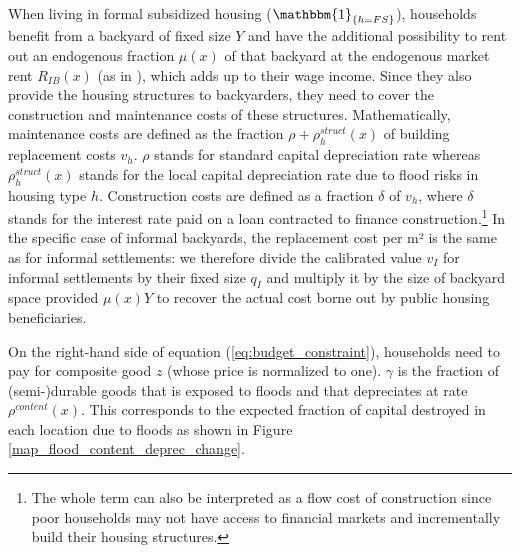 \documentclass[12pt]{article}
\begin{document}
When living in formal subsidized housing ($\mathbbm{1}_{\{h=FS\}}$), households benefit from a backyard of fixed size $Y$ and have the additional possibility to rent out an endogenous fraction $\mu(x)$ of that backyard at the endogenous market rent $R_{IB}(x)$ (as in \citet{Brueckner2019Backyarding:Africa}), which adds up to their wage income. Since they also provide the housing structures to backyarders, they need to cover the construction and maintenance costs of these structures. Mathematically, maintenance costs are defined as the fraction $\rho + \rho_h^{struct}(x)$ of building replacement costs $v_h$. $\rho$ stands for standard capital depreciation rate whereas $\rho_h^{struct}(x)$ stands for the local capital depreciation rate due to flood risks in housing type $h$. Construction costs are defined as a fraction $\delta$ of $v_h$, where $\delta$ stands for the interest rate paid on a loan contracted to finance construction.\footnote{The whole term can also be interpreted as a flow cost of construction since poor households may not have access to financial markets and incrementally build their housing structures.} In the specific case of informal backyards, the replacement cost per m² is the same as for informal settlements: we therefore divide the calibrated value $v_I$ for informal settlements by their fixed size $q_I$ and multiply it by the size of backyard space provided $\mu(x)Y$ to recover the actual cost borne out by public housing beneficiaries.


On the right-hand side of equation (\ref{eq:budget_constraint}), households need to pay for composite good $z$ (whose price is normalized to one). $\gamma$ is the fraction of (semi-)durable goods that is exposed to floods and that depreciates at rate $\rho^{content}(x)$. This corresponds to the expected fraction of capital destroyed in each location due to floods as shown in Figure \ref{map_flood_content_deprec_change}. 
\end{document}
